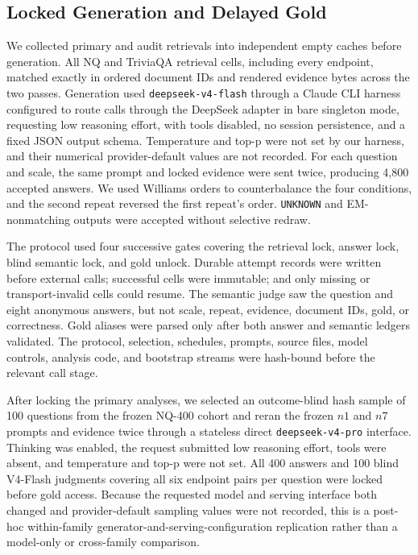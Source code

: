 \documentclass[sigconf,nonacm]{acmart}
\newcommand{\none}{\ensuremath{n1}}
\newcommand{\nseven}{\ensuremath{n7}}
\begin{document}
\subsection{Locked Generation and Delayed Gold}

We collected primary and audit retrievals into independent empty caches before generation. All NQ and TriviaQA retrieval cells, including every endpoint, matched exactly in ordered document IDs and rendered evidence bytes across the two passes. Generation used \texttt{deepseek-v4-flash} through a Claude CLI harness configured to route calls through the DeepSeek adapter in bare singleton mode, requesting low reasoning effort, with tools disabled, no session persistence, and a fixed JSON output schema. Temperature and top-p were not set by our harness, and their numerical provider-default values are not recorded. For each question and scale, the same prompt and locked evidence were sent twice, producing 4,800 accepted answers. We used Williams orders \cite{williams1949design} to counterbalance the four conditions, and the second repeat reversed the first repeat's order. \texttt{UNKNOWN} and EM-nonmatching outputs were accepted without selective redraw.

The protocol used four successive gates covering the retrieval lock, answer lock, blind semantic lock, and gold unlock. Durable attempt records were written before external calls; successful cells were immutable; and only missing or transport-invalid cells could resume.  The semantic judge saw the question and eight anonymous answers, but not scale, repeat, evidence, document IDs, gold, or correctness. Gold aliases were parsed only after both answer and semantic ledgers validated. The protocol, selection, schedules, prompts, source files, model controls, analysis code, and bootstrap streams were hash-bound before the relevant call stage.

After locking the primary analyses, we selected an outcome-blind hash sample of 100 questions from the frozen NQ-400 cohort and reran the frozen $\none$ and $\nseven$ prompts and evidence twice through a stateless direct \texttt{deepseek-v4-pro} interface. Thinking was enabled, the request submitted low reasoning effort, tools were absent, and temperature and top-p were not set. All 400 answers and 100 blind V4-Flash judgments covering all six endpoint pairs per question were locked before gold access. Because the requested model and serving interface both changed and provider-default sampling values were not recorded, this is a post-hoc within-family generator-and-serving-configuration replication rather than a model-only or cross-family comparison.
\end{document}

